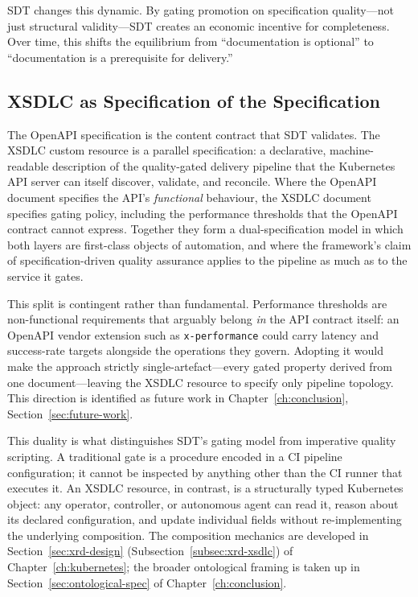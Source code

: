 SDT changes this dynamic. By gating promotion on specification quality---not just structural validity---SDT creates an economic incentive for completeness. Over time, this shifts the equilibrium from ``documentation is optional'' to ``documentation is a prerequisite for delivery.''

\subsection{XSDLC as Specification of the Specification}
\label{subsec:xsdlc-as-spec}

The OpenAPI specification is the content contract that SDT validates. The XSDLC custom resource is a parallel specification: a declarative, machine-readable description of the quality-gated delivery pipeline that the Kubernetes API server can itself discover, validate, and reconcile. Where the OpenAPI document specifies the API's \emph{functional} behaviour, the XSDLC document specifies gating policy, including the performance thresholds that the OpenAPI contract cannot express. Together they form a dual-specification model in which both layers are first-class objects of automation, and where the framework's claim of specification-driven quality assurance applies to the pipeline as much as to the service it gates.

This split is contingent rather than fundamental. Performance thresholds are non-functional requirements that arguably belong \emph{in} the API contract itself: an OpenAPI vendor extension such as \texttt{x-performance} could carry latency and success-rate targets alongside the operations they govern. Adopting it would make the approach strictly single-artefact---every gated property derived from one document---leaving the XSDLC resource to specify only pipeline topology. This direction is identified as future work in Chapter~\ref{ch:conclusion}, Section~\ref{sec:future-work}.

This duality is what distinguishes SDT's gating model from imperative quality scripting. A traditional gate is a procedure encoded in a CI pipeline configuration; it cannot be inspected by anything other than the CI runner that executes it. An XSDLC resource, in contrast, is a structurally typed Kubernetes object: any operator, controller, or autonomous agent can read it, reason about its declared configuration, and update individual fields without re-implementing the underlying composition. The composition mechanics are developed in Section~\ref{sec:xrd-design} (Subsection~\ref{subsec:xrd-xsdlc}) of Chapter~\ref{ch:kubernetes}; the broader ontological framing is taken up in Section~\ref{sec:ontological-spec} of Chapter~\ref{ch:conclusion}.

